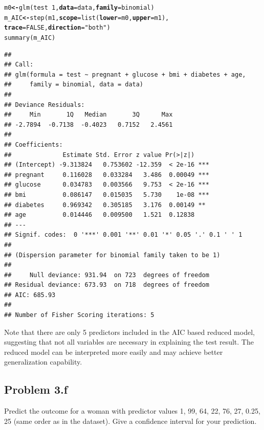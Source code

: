 \documentclass[12pt,oneside,a4paper]{article}\usepackage[]{graphicx}\usepackage[]{xcolor}
\makeatletter
\newcommand{\hlnum}[1]{\textcolor[rgb]{0,0,0}{#1}}%
\newcommand{\hlstr}[1]{\textcolor[rgb]{0,0,1}{#1}}%
\newcommand{\hlopt}[1]{\textcolor[rgb]{0,0,0}{#1}}%
\newcommand{\hlstd}[1]{\textcolor[rgb]{0,0,0}{#1}}%
\newcommand{\hlkwb}[1]{\textcolor[rgb]{0.498,0,0.333}{\textbf{#1}}}%
\newcommand{\hlkwc}[1]{\textcolor[rgb]{0.498,0,0.333}{\textbf{#1}}}%
\newcommand{\hlkwd}[1]{\textcolor[rgb]{0,0,0}{#1}}%
\newenvironment{kframe}{%
 \def\at@end@of@kframe{}%
 \ifinner\ifhmode%
  \def\at@end@of@kframe{\end{minipage}}%
  \begin{minipage}{\columnwidth}%
 \fi\fi%
 \def\FrameCommand##1{\hskip\@totalleftmargin \hskip-\fboxsep
 \colorbox{shadecolor}{##1}\hskip-\fboxsep
     \hskip-\linewidth \hskip-\@totalleftmargin \hskip\columnwidth}%
 \MakeFramed {\advance\hsize-\width
   \@totalleftmargin\z@ \linewidth\hsize
   \@setminipage}}%
 {\par\unskip\endMakeFramed%
 \at@end@of@kframe}
\newenvironment{knitrout}{}{} %
\newcommand{\subproblem}[1]
{
    \subsection*{Problem {#1}}
}
\makeatother
\begin{document}
\begin{knitrout}
\color{fgcolor}\begin{kframe}
\begin{alltt}
\hlstd{m0} \hlkwb{<-} \hlkwd{glm}\hlstd{(test} \hlopt{~} \hlnum{1}\hlstd{,} \hlkwc{data} \hlstd{= data,} \hlkwc{family} \hlstd{= binomial)}
\hlstd{m_AIC} \hlkwb{<-} \hlkwd{step}\hlstd{(m1,} \hlkwc{scope} \hlstd{=} \hlkwd{list}\hlstd{(}\hlkwc{lower} \hlstd{= m0,} \hlkwc{upper} \hlstd{= m1),}
              \hlkwc{trace} \hlstd{=} \hlnum{FALSE}\hlstd{,} \hlkwc{direction} \hlstd{=} \hlstr{"both"}\hlstd{)}
\hlkwd{summary}\hlstd{(m_AIC)}
\end{alltt}
\begin{verbatim}
## 
## Call:
## glm(formula = test ~ pregnant + glucose + bmi + diabetes + age, 
##     family = binomial, data = data)
## 
## Deviance Residuals: 
##     Min       1Q   Median       3Q      Max  
## -2.7894  -0.7138  -0.4023   0.7152   2.4561  
## 
## Coefficients:
##              Estimate Std. Error z value Pr(>|z|)    
## (Intercept) -9.313824   0.753602 -12.359  < 2e-16 ***
## pregnant     0.116028   0.033284   3.486  0.00049 ***
## glucose      0.034783   0.003566   9.753  < 2e-16 ***
## bmi          0.086147   0.015035   5.730    1e-08 ***
## diabetes     0.969342   0.305185   3.176  0.00149 ** 
## age          0.014446   0.009500   1.521  0.12838    
## ---
## Signif. codes:  0 '***' 0.001 '**' 0.01 '*' 0.05 '.' 0.1 ' ' 1
## 
## (Dispersion parameter for binomial family taken to be 1)
## 
##     Null deviance: 931.94  on 723  degrees of freedom
## Residual deviance: 673.93  on 718  degrees of freedom
## AIC: 685.93
## 
## Number of Fisher Scoring iterations: 5
\end{verbatim}
\end{kframe}
\end{knitrout}

Note that there are only 5 predictors included in the AIC based reduced model, suggesting that not all variables are necessary in explaining the test result. The reduced model can be interpreted more easily and may achieve better generalization capability.

\subproblem{3.f}
Predict the outcome for a woman with predictor values 1, 99, 64, 22, 76, 27, 0.25, 25 (same order as in the dataset). Give a confidence interval for your prediction.
\end{document}
